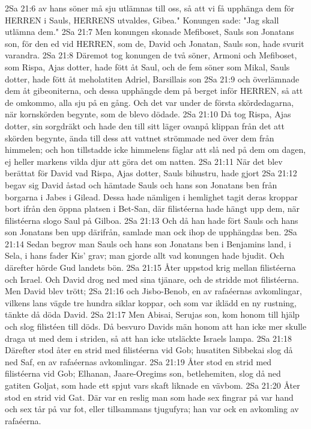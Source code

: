 2Sa 21:6  av hans söner må sju utlämnas till oss, så att vi få upphänga dem för HERREN i Sauls, HERRENS utvaldes, Gibea." Konungen sade: "Jag skall utlämna dem."
2Sa 21:7  Men konungen skonade Mefiboset, Sauls son Jonatans son, för den ed vid HERREN, som de, David och Jonatan, Sauls son, hade svurit varandra.
2Sa 21:8  Däremot tog konungen de två söner, Armoni och Mefiboset, som Rispa, Ajas dotter, hade fött åt Saul, och de fem söner som Mikal, Sauls dotter, hade fött åt meholatiten Adriel, Barsillais son
2Sa 21:9  och överlämnade dem åt gibeoniterna, och dessa upphängde dem på berget inför HERREN, så att de omkommo, alla sju på en gång. Och det var under de första skördedagarna, när kornskörden begynte, som de blevo dödade.
2Sa 21:10  Då tog Rispa, Ajas dotter, sin sorgdräkt och hade den till sitt läger ovanpå klippan från det att skörden begynte, ända till dess att vattnet strömmade ned över dem från himmelen; och hon tillstadde icke himmelens fåglar att slå ned på dem om dagen, ej heller markens vilda djur att göra det om natten.
2Sa 21:11  När det blev berättat för David vad Rispa, Ajas dotter, Sauls bihustru, hade gjort
2Sa 21:12  begav sig David åstad och hämtade Sauls och hans son Jonatans ben från borgarna i Jabes i Gilead. Dessa hade nämligen i hemlighet tagit deras kroppar bort ifrån den öppna platsen i Bet-San, där filistéerna hade hängt upp dem, när filistéerna slogo Saul på Gilboa.
2Sa 21:13  Och då han hade fört Sauls och hans son Jonatans ben upp därifrån, samlade man ock ihop de upphängdas ben.
2Sa 21:14  Sedan begrov man Sauls och hans son Jonatans ben i Benjamins land, i Sela, i hans fader Kis' grav; man gjorde allt vad konungen hade bjudit. Och därefter hörde Gud landets bön.
2Sa 21:15  Åter uppstod krig mellan filistéerna och Israel. Och David drog ned med sina tjänare, och de stridde mot filistéerna. Men David blev trött;
2Sa 21:16  och Jisbo-Benob, en av rafaéernas avkomlingar, vilkens lans vägde tre hundra siklar koppar, och som var iklädd en ny rustning, tänkte då döda David.
2Sa 21:17  Men Abisai, Serujas son, kom honom till hjälp och slog filistéen till döds. Då besvuro Davids män honom att han icke mer skulle draga ut med dem i striden, så att han icke utsläckte Israels lampa.
2Sa 21:18  Därefter stod åter en strid med filistéerna vid Gob; husatiten Sibbekai slog då ned Saf, en av rafaéernas avkomlingar.
2Sa 21:19  Åter stod en strid med filistéerna vid Gob; Elhanan, Jaare-Oregims son, betlehemiten, slog då ned gatiten Goljat, som hade ett spjut vars skaft liknade en vävbom.
2Sa 21:20  Åter stod en strid vid Gat. Där var en reslig man som hade sex fingrar på var hand och sex tår på var fot, eller tillsammans tjugufyra; han var ock en avkomling av rafaéerna.
